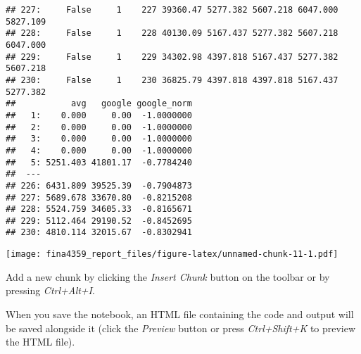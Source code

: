 \documentclass[
]{article}
\newenvironment{Shaded}{\begin{snugshade}}{\end{snugshade}}
\newcommand{\CommentTok}[1]{\textcolor[rgb]{0.56,0.35,0.01}{\textit{#1}}}
\newcommand{\DataTypeTok}[1]{\textcolor[rgb]{0.13,0.29,0.53}{#1}}
\newcommand{\KeywordTok}[1]{\textcolor[rgb]{0.13,0.29,0.53}{\textbf{#1}}}
\newcommand{\NormalTok}[1]{#1}
\newcommand{\OperatorTok}[1]{\textcolor[rgb]{0.81,0.36,0.00}{\textbf{#1}}}
\newcommand{\StringTok}[1]{\textcolor[rgb]{0.31,0.60,0.02}{#1}}
\begin{document}
\begin{verbatim}
## 227:     False     1    227 39360.47 5277.382 5607.218 6047.000 5827.109
## 228:     False     1    228 40130.09 5167.437 5277.382 5607.218 6047.000
## 229:     False     1    229 34302.98 4397.818 5167.437 5277.382 5607.218
## 230:     False     1    230 36825.79 4397.818 4397.818 5167.437 5277.382
##           avg   google google_norm
##   1:    0.000     0.00  -1.0000000
##   2:    0.000     0.00  -1.0000000
##   3:    0.000     0.00  -1.0000000
##   4:    0.000     0.00  -1.0000000
##   5: 5251.403 41801.17  -0.7784240
##  ---                              
## 226: 6431.809 39525.39  -0.7904873
## 227: 5689.678 33670.80  -0.8215208
## 228: 5524.759 34605.33  -0.8165671
## 229: 5112.464 29190.52  -0.8452695
## 230: 4810.114 32015.67  -0.8302941
\end{verbatim}

\begin{Shaded}
\end{Shaded}

\texttt{[image: fina4359\_report\_files/figure-latex/unnamed-chunk-11-1.pdf]}

\begin{Shaded}
\end{Shaded}

Add a new chunk by clicking the \emph{Insert Chunk} button on the
toolbar or by pressing \emph{Ctrl+Alt+I}.

When you save the notebook, an HTML file containing the code and output
will be saved alongside it (click the \emph{Preview} button or press
\emph{Ctrl+Shift+K} to preview the HTML file).
\end{document}
